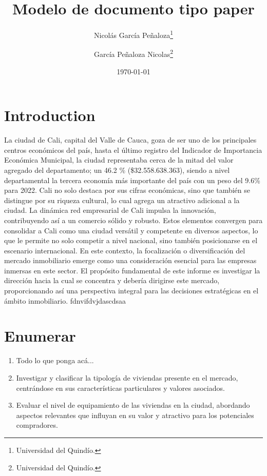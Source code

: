 \documentclass[12pt]{article}
\title{\textbf{Modelo de documento tipo paper}}
\author{Nicolás García Peñaloza\thanks{Universidad del Quindío.} \and García Peñaloza Nicolas\thanks{Universidad del Quindío.}}
\date{\today}
\begin{document}
\maketitle

\section{Introduction}
La ciudad de Cali, capital del Valle de Cauca, goza de ser uno de los principales centros económicos del país, hasta el último registro del Indicador de Importancia Económica Municipal, la ciudad representaba cerca de la mitad del valor agregado del departamento; un 46.2 \% (\$32.558.638.363), siendo a nivel departamental la tercera economía más importante del país con un peso del 9.6\% para 2022. 
Cali no solo destaca por sus cifras económicas, sino que también se distingue por su riqueza cultural, lo cual agrega un atractivo adicional a la ciudad. La dinámica red empresarial de Cali impulsa la innovación, contribuyendo así a un comercio sólido y robusto. Estos elementos convergen para consolidar a Cali como una ciudad versátil y competente en diversos aspectos, lo que le permite no solo competir a nivel nacional, sino también posicionarse en el escenario internacional.
En este contexto, la focalización o diversificación del mercado inmobiliario emerge como una consideración esencial para las empresas inmersas en este sector. El propósito fundamental de este informe es investigar la dirección hacia la cual se concentra y debería dirigirse este mercado, proporcionando así una perspectiva integral para las decisiones estratégicas en el ámbito inmobiliario.
fdnvifdvjdascdsaa

\section{Enumerar}

\begin{enumerate} %
 \item Todo lo que ponga acá...

 \item Investigar y clasificar la tipología de viviendas presente en el mercado, centrándose en sus características particulares y valores asociados.

\item Evaluar el nivel de equipamiento de las viviendas en la ciudad, abordando aspectos relevantes que influyan en su valor y atractivo para los potenciales compradores.
\end{enumerate}
\end{document}
